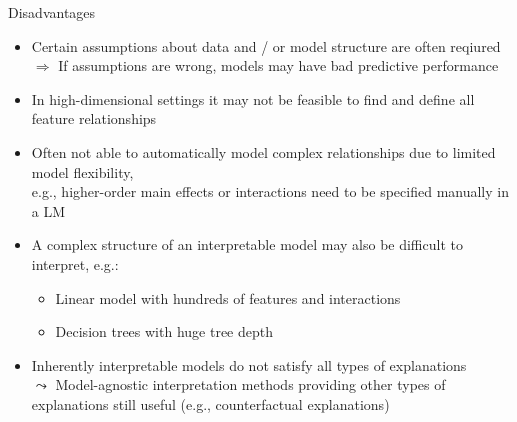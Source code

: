 \documentclass[11pt,compress,t,notes=noshow, aspectratio=169, xcolor=table]{beamer}
\begin{document}
\begin{frame}{Disadvantages}

    \begin{itemize}[<+->]
    \itemsep1em
        \item Certain assumptions about data and / or model structure are often reqiured\\
        $\Rightarrow$ If assumptions are wrong, models may have bad predictive performance
        \item In high-dimensional settings it may not be feasible to find and define all feature relationships
        \item Often not able to automatically model complex relationships due to limited model flexibility, \\
        e.g., higher-order main effects or interactions need to be specified manually in a LM
        \item A complex structure of an interpretable model may also be difficult to interpret, e.g.:
        \begin{itemize}
            \item Linear model with hundreds of features and interactions 
            \item Decision trees with huge tree depth
        \end{itemize}
        \item Inherently interpretable models do not satisfy all types of explanations\\
        $\leadsto$ Model-agnostic interpretation methods providing other types of explanations still useful (e.g., counterfactual explanations)
    \end{itemize}

\end{frame}
\end{document}
